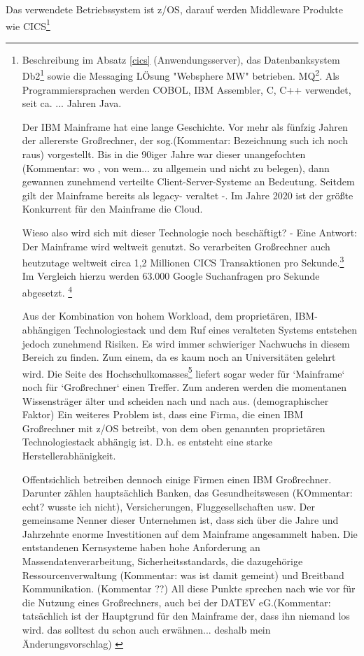 Das verwendete Betriebssystem ist z/OS, darauf werden Middleware Produkte wie CICS\footnote{Beschreibung im Absatz \ref{cics} (Anwendungsserver), das Datenbanksystem Db2\footnote{eine relationale Datenbank} sowie die Messaging LÖsung "Websphere MW" betrieben.
MQ\footnote{Beschreibung im Absatz \ref{sec:mq} zu finden}.
Als Programmiersprachen werden COBOL, IBM Assembler, C, C++ verwendet, seit ca. ... Jahren Java.

Der IBM Mainframe hat eine lange Geschichte.
Vor mehr als fünfzig Jahren der allererste Großrechner, der sog.(Kommentar: Bezeichnung such ich noch raus) vorgestellt.
Bis in die 90iger Jahre war dieser unangefochten (Kommentar: wo , von wem... zu allgemein und nicht zu belegen), dann gewannen zunehmend verteilte Client-Server-Systeme an Bedeutung. Seitdem gilt der Mainframe bereits als \glqq  legacy\grqq{}- veraltet -.
Im Jahre 2020 ist der größte Konkurrent für den Mainframe die Cloud.

Wieso also wird sich mit dieser Technologie noch beschäftigt? - Eine Antwort: Der Mainframe wird weltweit genutzt.
So verarbeiten Großrechner auch heutzutage weltweit circa 1,2 Millionen CICS Transaktionen pro Sekunde.\footnote{\cite{IBM.2019}}
Im Vergleich hierzu werden 63.000 Google Suchanfragen pro Sekunde abgesetzt. \footnote{\cite{Sullivan.2016}}

Aus der Kombination von hohem Workload, dem proprietären, IBM-abhängigen Technologiestack und dem Ruf eines veralteten Systems entstehen jedoch zunehmend Risiken.
Es wird immer schwieriger Nachwuchs in diesem Bereich zu finden.
Zum einem,  da es kaum noch an Universitäten gelehrt wird.
Die Seite des Hochschulkomasses\footnote{\cite{internetagenturKolnFrankfurtsunzinetTYPO3Programmmierung.}} liefert sogar weder für `Mainframe` noch für `Großrechner` einen Treffer.
Zum anderen werden die momentanen Wissensträger älter und scheiden nach und nach aus. (demographischer Faktor)
Ein weiteres Problem ist, dass eine Firma, die einen IBM Großrechner mit z/OS betreibt, von dem oben genannten proprietären Technologiestack abhängig ist. 
D.h. es entsteht eine starke Herstellerabhänigkeit.

Offentsichlich betreiben dennoch einige Firmen einen IBM Großrechner.
Darunter zählen hauptsächlich Banken, das Gesundheitswesen (KOmmentar: echt? wusste ich nicht), Versicherungen, Fluggesellschaften usw.
Der gemeinsame Nenner dieser Unternehmen ist, dass sich über die Jahre und Jahrzehnte enorme Investitionen auf dem Mainframe angesammelt haben. Die entstandenen Kernsysteme haben hohe Anforderung an Massendatenverarbeitung,  Sicherheitsstandards, die dazugehörige Ressourcenverwaltung (Kommentar: was ist damit gemeint) und Breitband Kommunikation. (Kommentar ??) 
All diese Punkte sprechen nach wie vor für die Nutzung eines Großrechners, auch bei der DATEV eG.(Kommentar: tatsächlich ist der Hauptgrund für den Mainframe der, dass ihn niemand los wird. das solltest du schon auch erwähnen... deshalb mein Änderungsvorschlag)
\cite{IBM.2014}

}

